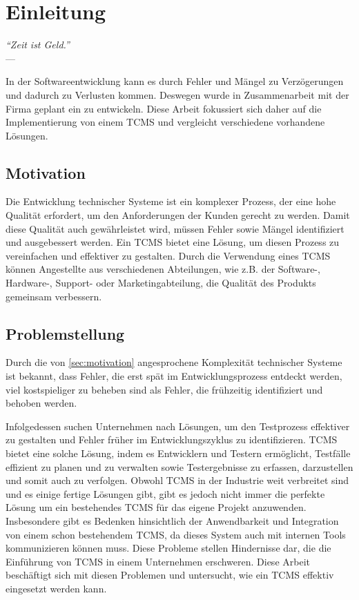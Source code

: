 \documentclass[a4paper, fontsize=11pt, parskip=half, twoside]{scrreprt}
\begin{document}
	
	
	\clearpage
	\chapter{Einleitung}
	
	\begin{flushright}
		\rightskip=8cm\textit{``Zeit ist Geld.''} \\
		\vspace{.2em}
		\rightskip=6cm--- \textcite{franklin1748advice}
	\end{flushright}

	In der Softwareentwicklung kann es durch Fehler und Mängel zu Verzögerungen und dadurch zu Verlusten kommen.
	Deswegen wurde in Zusammenarbeit mit der Firma  geplant ein  zu entwickeln.
	Diese Arbeit fokussiert sich daher auf die Implementierung von einem \ac{TCMS} und vergleicht verschiedene vorhandene Lösungen.
	
	
	\section{Motivation} \label{sec:motivation}
	Die Entwicklung technischer Systeme ist ein komplexer Prozess, der eine hohe Qualität erfordert, um den Anforderungen der Kunden gerecht zu werden. 
	Damit diese Qualität auch gewährleistet wird, müssen Fehler sowie Mängel identifiziert und ausgebessert werden. 
	Ein \ac{TCMS} bietet eine Lösung, um diesen Prozess zu vereinfachen und effektiver zu gestalten. 
	Durch die Verwendung eines \ac{TCMS} können Angestellte aus verschiedenen Abteilungen, wie z.B. der Software-, Hardware-, Support- oder Marketingabteilung, die Qualität des Produkts gemeinsam verbessern. 
	
	\section{Problemstellung}
	Durch die von \autoref{sec:motivation} angesprochene Komplexität technischer Systeme ist bekannt, dass Fehler, die erst spät im Entwicklungsprozess entdeckt werden, viel kostspieliger zu beheben sind als Fehler, die frühzeitig identifiziert und behoben werden. \textcite{westland_cost_2002}
	
	Infolgedessen suchen Unternehmen nach Lösungen, um den Testprozess effektiver zu gestalten und Fehler früher im Entwicklungszyklus zu identifizieren. 
	\ac{TCMS} bietet eine solche Lösung, indem es Entwicklern und Testern ermöglicht, Testfälle effizient zu planen und zu verwalten sowie Testergebnisse zu erfassen, darzustellen und somit auch zu verfolgen. 
	Obwohl \ac{TCMS} in der Industrie weit verbreitet sind und es einige fertige Lösungen gibt, gibt es jedoch nicht immer die perfekte Lösung um ein bestehendes \ac{TCMS} für das eigene Projekt anzuwenden. 
	Insbesondere gibt es Bedenken hinsichtlich der Anwendbarkeit und Integration von einem schon bestehendem \ac{TCMS}, da dieses System auch mit internen Tools kommunizieren können muss.
	Diese Probleme stellen Hindernisse dar, die die Einführung von \ac{TCMS} in einem Unternehmen erschweren. 
	Diese Arbeit beschäftigt sich mit diesen Problemen und untersucht, wie ein \ac{TCMS} effektiv eingesetzt werden kann.
	
\end{document}
